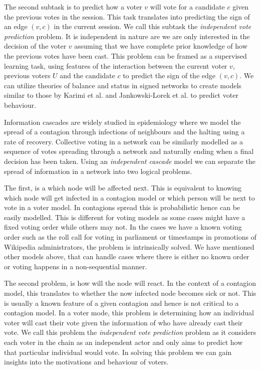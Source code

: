 The second subtask is to predict how a voter $v$ will vote for a candidate $c$ given the previous votes in the session. This task translates into predicting the sign of an edge $(v,c)$ in the current session. We call this subtask the \textit{independent vote prediction} problem. It is independent in nature are we are only interested in the decision of the voter $v$ assuming that we have complete prior knowledge of how the previous votes have been cast. This problem can be framed as a supervised learning task, using features of the interaction between the current voter $v$, previous voters $U$ and the candidate $c$ to predict the sign of the edge $(v,c)$. We can utilize theories of balance and status in signed networks to create models similar to those by Karimi et al. \cite{karimi2019multicongress} and Jankowski-Lorek et al. \cite{jankowski-lorek2013MBSN} to predict voter behaviour.

\iffalse
{}
Information cascades are widely studied in epidemiology where we model the spread of a contagion through infections of neighbours and the halting using a rate of recovery. Collective voting in a network can be similarly modelled as a sequence of votes spreading through a network and naturally ending when a final decision has been taken. Using an \textit{independent cascade} model we can separate the spread of information in a network into two logical problems.

The first, is a which node will be affected next. This is equivalent to knowing which node will get infected in a contagion model or which person will be next to vote in a voter model. In contagions spread this is probabilistic hence can be easily modelled. This is different for voting models as some cases might have a fixed voting order while others may not. In the cases we have a known voting order such as the roll call for voting in parliament or timestamps in promotions of Wikipedia administrators, the problem is intrinsically solved. We have mentioned other models above, that can handle cases where there is either no known order or voting happens in a non-sequential manner. 

The second problem, is how will the node will react. In the context of a contagion model, this translates to whether the now infected node becomes sick or not. This is usually a known feature of a given contagion and hence is not critical to a contagion model. In a voter mode, this problem is determining how an individual voter will cast their vote given the information of who have already cast their vote. We call this problem the \textit{independent vote prediction} problem as it considers each voter in the chain as an independent actor and only aims to predict how that particular individual would vote. In solving this problem we can gain insights into the motivations and behaviour of voters. 

